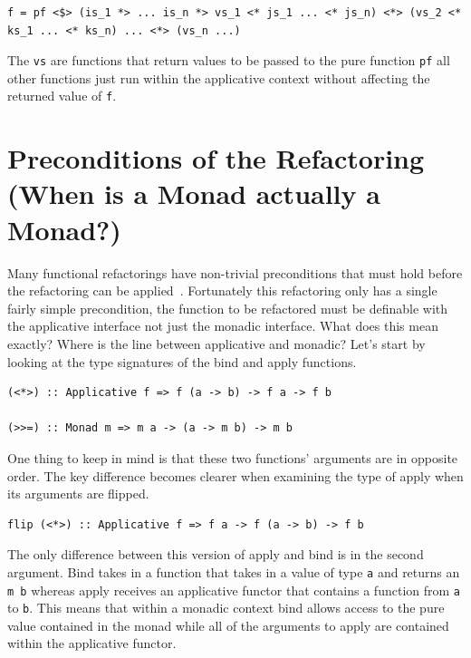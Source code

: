 \begin{lstlisting}[frame=tblr]
f = pf <$> (is_1 *> ... is_n *> vs_1 <* js_1 ... <* js_n) <*> (vs_2 <* ks_1 ... <* ks_n) ... <*> (vs_n ...)
\end{lstlisting}

The \texttt{vs} are functions that return values to be passed to the pure function \texttt{pf} all other functions just run within the applicative context without affecting the returned value of \texttt{f}.

\section{Preconditions of the Refactoring (When is a Monad actually a Monad?)}
\label{sec:appPrecons}

Many functional refactorings have non-trivial preconditions that must hold before the refactoring can be applied~\citep{refacTools}. Fortunately this refactoring only has a single fairly simple precondition, the function to be refactored must be definable with the applicative interface not just the monadic interface. What does this mean exactly? Where is the line between applicative and monadic? Let's start by looking at the type signatures of the bind and apply functions.

\begin{lstlisting}[frame=tblr]
(<*>) :: Applicative f => f (a -> b) -> f a -> f b

(>>=) :: Monad m => m a -> (a -> m b) -> m b
\end{lstlisting}  

One thing to keep in mind is that these two functions' arguments are in opposite order. The key difference becomes clearer when examining the type of apply when its arguments are flipped.

\begin{lstlisting}[frame=tblr]
flip (<*>) :: Applicative f => f a -> f (a -> b) -> f b
\end{lstlisting}

The only difference between this version of apply and bind is in the second argument. Bind takes in a function that takes in a value of type \texttt{a} and returns an \texttt{m b} whereas apply receives an applicative functor that contains a function from \texttt{a} to \texttt{b}. This means that within a monadic context bind allows access to the pure value contained in the monad while all of the arguments to apply are contained within the applicative functor.

